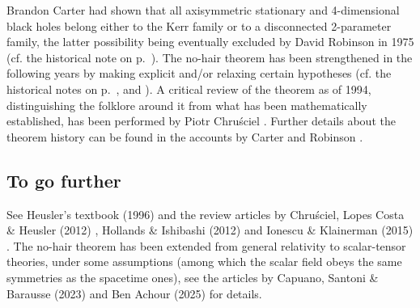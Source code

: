 \begin{hist}
Brandon Carter \cite{Carte71} had shown
that all axisymmetric stationary and 4-dimensional black holes belong either to the
Kerr family or to a disconnected 2-parameter family, the latter possibility
being eventually excluded
by David Robinson in 1975 \cite{Robin75}
(cf. the historical note on p.~\pageref{h:sta:axisym_uniqueness}).
The no-hair theorem has been strengthened in the following years by making explicit
and/or relaxing certain hypotheses (cf. the historical notes on p.~\pageref{h:sta:Israel_thm_vacuum},
\pageref{h:sta:Israel_thm_electrovac} and \pageref{h:sta:axisym_uniqueness}).
A critical review of the theorem as of 1994, distinguishing the folklore around it from what has been mathematically established, has been performed by
Piotr Chru\'sciel \cite{Chrus94}.
Further details about the theorem history can be found in the accounts by Carter \cite{Carte99} and Robinson \cite{Robin09}.
\end{hist}


\subsection{To go further}

See Heusler's textbook (1996) \cite{Heusl96} and the review
articles by Chru\'sciel, Lopes Costa \& Heusler (2012) \cite{ChrusLH12},
Hollands \& Ishibashi (2012) \cite{HollaI12} and
Ionescu \& Klainerman (2015) \cite{IonesK15}.
The no-hair theorem has been extended from general relativity to scalar-tensor theories, under some assumptions
(among which the scalar field obeys the same symmetries as the spacetime ones), see the articles by
Capuano, Santoni \& Barausse (2023) \cite{CapuaSB23} and Ben Achour (2025) \cite{BenAc25} for details.

